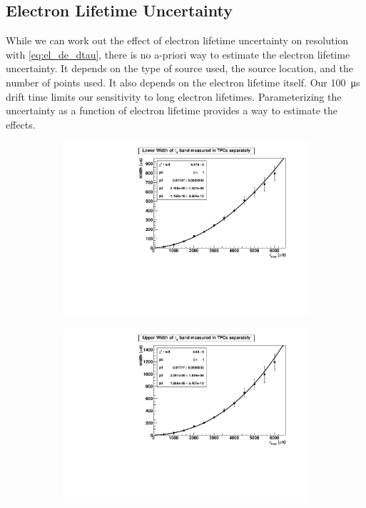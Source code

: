 \documentclass[herrin-thesis.tex]{subfiles}
\begin{document}
\subsection{Electron Lifetime Uncertainty}
\label{subsec:dtau}
While we can work out the effect of electron lifetime uncertainty on resolution with \cref{eq:el_de_dtau}, there is no a-priori way to estimate the electron lifetime uncertainty. It depends on the type of source used, the source location, and the number of points used. It also depends on the electron lifetime itself. Our \SI{100}{\micro\second} drift time limits our sensitivity to long electron lifetimes. Parameterizing the uncertainty as a function of electron lifetime provides a way to estimate the effects.

\begin{figure}[htd]
\begin{subfigure}[b]{0.5\linewidth}
\centering
\includegraphics[width=1.0\columnwidth]{./plots/el_sim_errm_fit.pdf}
\end{subfigure}%
\begin{subfigure}[b]{0.5\linewidth}
\centering
\includegraphics[width=1.0\columnwidth]{./plots/el_sim_errp_fit.pdf}

\end{subfigure}
\end{figure}
\end{document}

